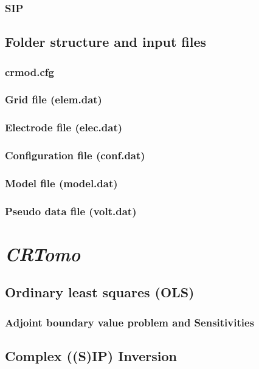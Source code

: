 \documentclass[12pt,a4paper,twoside,titlepage,draft]{book}
\newcommand{\crt}{{\it CRTomo }}
\theoremstyle{aufgaben}
\theoremstyle{remark}
\begin{document}
\subsection{SIP}\label{sub:crmod_sip}
\clearpage
\section{Folder structure and input files}\label{sect:crmod_dir}
\subsection{crmod.cfg}\label{sub:crmod_input}
\subsection{Grid file (elem.dat)}\label{sub:crmod_grid}
\subsection{Electrode file (elec.dat)}\label{sub:crmod_elec}
\subsection{Configuration file (conf.dat)}\label{sub:crmod_conf}
\subsection{Model file (model.dat)}\label{sub:crmod_modl}
\subsection{Pseudo data file (volt.dat)}\label{sub:crmod_volt}
\chapter{\crt}\label{chap:crtomo}
\section{Ordinary least squares (OLS)}\label{sect:crtomo_ols}
\subsection{Adjoint boundary value problem and Sensitivities}\label{sub:crtomo_adj}
\section{Complex ((S)IP) Inversion}\label{sect:crtomo_cmplx}
\end{document}
